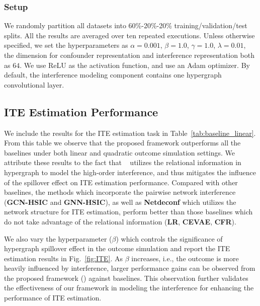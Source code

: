 \subsubsection{Setup} We randomly partition all datasets into 60\%-20\%-20\% training/validation/test splits. All the results are averaged over ten repeated executions. Unless otherwise specified, we set the hyperparameters as $\alpha=0.001$, $\beta=1.0$, $\gamma=1.0$, $\lambda=0.01$, the dimension for confounder representation and interference representation both as $64$. We use ReLU as the  activation function, and use an Adam optimizer. By default, the interference modeling component contains one hypergraph convolutional layer.

\subsection{ITE Estimation Performance}
We include the results for the ITE estimation task in Table~\ref{tab:baseline_linear}. From this table we 
observe that the proposed framework outperforms all the baselines under both linear and quadratic outcome simulation settings. We attribute these results to the fact that \mymodel~ utilizes the  relational information in hypergraph to model the high-order interference, and thus mitigates the influence of the spillover effect on ITE estimation performance. 
Compared with other baselines, the methods which incorporate the pairwise network interference (\textbf{GCN-HSIC} and \textbf{GNN-HSIC}), as well as \textbf{Netdeconf} which utilizes the network structure for ITE estimation, perform better than those baselines which do not take advantage of the relational information (\textbf{LR}, \textbf{CEVAE}, \textbf{CFR}). 

We also vary the hyperparameter ($\beta$) which controls the significance of hypergraph spillover effect in the outcome simulation and report the ITE estimation results in Fig.~\ref{fig:ITE}.
As $\beta$ increases, i.e., the outcome is more heavily influenced by interference, larger performance gains can be observed from the proposed framework (\mymodel) against baselines. 
This observation further validates the effectiveness of our framework in modeling the interference for enhancing the performance of ITE estimation.



